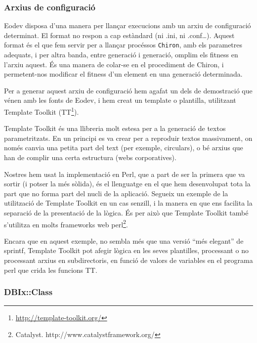 \subsubsection{Arxius de configuració} %
\label{ssub:Arxius de configuracio}

Eodev disposa d'una manera per llançar execucions amb un arxiu de configuració
determinat.  El format no respon a cap estàndard (ni .ini, ni .conf\ldots).
Aquest format és el que fem servir per a llançar procéssos \texttt{Chiron}, amb
els parametres adequats, i per altra banda, entre generació i generació, omplim
els fitness en l'arxiu aquest.  És una manera de colar-se en el procediment de
Chiron, i permetent-nos modificar el fitness d'un element en una generació
determinada.

Per a generar aquest arxiu de configuració hem agafat un dels de demostració que
vénen amb les fonts de Eodev, i hem creat un template o plantilla, utilitzant
Template Toolkit (TT\footnote{\url{http://template-toolkit.org/}}).

Template Toolkit és una llibreria molt estesa per a la generació de textos
parametritzats.  En un principi es va crear per a reproduir textos massivament,
on només canvia una petita part del text (per exemple, circulars), o bé arxius
que han de complir una certa estructura (webs corporatives).

Nostres hem usat la implementació en Perl, que a part de ser la primera que va
sortir (i potser la més sòlida), és el llenguatge en el que hem desenvolupat
tota la part que no forma part del nucli de la aplicació.  Segueix un exemple de
la utilització de Template Toolkit en un cas senzill, i la manera en que ens
facilita la separació de la presentació de la lògica.  És per això que Template
Toolkit també s'utilitza en molts frameworks web perl\footnote{Catalyst.
http://www.catalystframework.org/}.

\lstset{language=perl, tabsize=2}
\lstset{commentstyle=\textit}


Encara que en aquest exemple, no sembla més que una versió ``més elegant'' de
sprintf, Template Toolkit pot afegir lògica en les seves plantilles, processant
o no processant arxius en subdirectoris, en funció de valors de variables en el
programa perl que crida les funcions TT.


\subsubsection{DBIx::Class} %
\label{ssub:DBIx Class}

